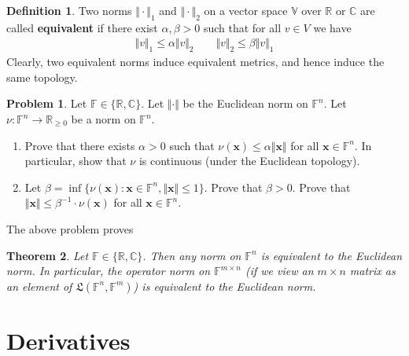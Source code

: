 \documentclass[12pt,b5paper,notitlepage]{article}
\theoremstyle{definition}
\newtheorem{df}{Definition}[section]
\newtheorem{prob}{\color{red}Problem}[section]
\theoremstyle{plain}
\newtheorem{thm}[df]{Theorem}
\newcommand{\fk}{\mathfrak}
\newcommand{\mbf}{\mathbf}
\newcommand{\Vbb}{\mathbb V}
\newcommand{\Cbb}{\mathbb C}
\newcommand{\Rbb}{\mathbb R}
\newcommand{\Fbb}{\mathbb F}
\numberwithin{equation}{section}
\begin{document}
\begin{df}
Two norms $\Vert\cdot\Vert_1$ and $\Vert\cdot\Vert_2$ on a vector space $\Vbb$ over $\Rbb$ or $\Cbb$ are called \textbf{equivalent}  if there exist $\alpha,\beta>0$ such that for all $v\in V$ we have
\begin{align*}
\Vert v\Vert_1\leq \alpha \Vert v\Vert_2\qquad \Vert v\Vert_2\leq \beta \Vert v\Vert_1
\end{align*}
Clearly, two equivalent norms induce equivalent metrics, and hence induce the same topology.
\end{df}


\begin{prob}\label{lb559}
Let $\Fbb\in\{\Rbb,\Cbb\}$. Let $\Vert\cdot\Vert$ be the Euclidean norm on $\Fbb^n$. Let $\nu:\Fbb^n\rightarrow\Rbb_{\geq 0}$ be a norm on $\Fbb^n$.
\begin{enumerate}
\item Prove that there exists $\alpha>0$ such that $\nu(\mbf x)\leq \alpha\Vert\mbf x\Vert$ for all $\mbf x\in\Fbb^n$. In particular, show that $\nu$ is continuous (under the Euclidean topology).
\item Let $\beta=\inf\{\nu(\mbf x):\mbf x\in\Fbb^n,\Vert \mbf x\Vert\leq 1\}$. Prove that $\beta>0$. Prove that $\Vert \mbf x\Vert\leq\beta^{-1}\cdot\nu(\mbf x)$ for all $\mbf x\in\Fbb^n$.
\end{enumerate}
\end{prob}


The above problem proves

\begin{thm}\label{lb363}
Let $\Fbb\in\{\Rbb,\Cbb\}$. Then any norm on $\Fbb^n$ is equivalent to the Euclidean norm. In particular, the operator norm on $\Fbb^{m\times n}$ (if we view an $m\times n$ matrix as an element of $\fk L(\Fbb^n,\Fbb^m)$) is equivalent to the Euclidean norm.
\end{thm}













\newpage







\section{Derivatives}
\end{document}
